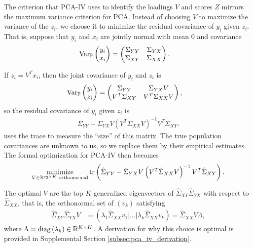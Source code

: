 \documentclass[utf8]{frontiersFPHY} %
\begin{document}
The criterion that PCA-IV uses to identify the loadings $V$ and scores $Z$
mirrors the maximum variance criterion for PCA. Instead of choosing $V$ to
maximize the variance of the $z_{i}$, we choose it to minimize the residual
covariance of $y_{i}$ given $z_{i}$. That is, suppose that $y_{i}$ and $x_{i}$
are jointly normal with mean 0 and covariance
\begin{align*}
\mathrm{Var}_{\mathbb{P}}\begin{pmatrix}y_{i} \\ x_{i}\end{pmatrix} &=
\begin{pmatrix}
  \Sigma_{YY} & \Sigma_{YX} \\ \Sigma_{XY} & \Sigma_{XX}
\end{pmatrix}.
\end{align*}

If $z_{i} = V^{T}x_{i}$, then the joint covariance of $y_{i}$ and $z_{i}$ is
\begin{align*}
  \mathrm{Var}_{\mathbb{P}}\begin{pmatrix} y_{i} \\ z_{i} \end{pmatrix} &=
  \begin{pmatrix}
    \Sigma_{YY} & \Sigma_{YX}V \\ V^{T}\Sigma_{XY} & V^{T}\Sigma_{XX}V
  \end{pmatrix},
\end{align*}
so the residual covariance of $y_i$ given $z_{i}$ is
\begin{align}
  \Sigma_{YY} -
  \Sigma_{YX}V\left(V^{T}\Sigma_{XX}V\right)^{-1}V^{T}\Sigma_{XY}. \label{eq:pca_iv_resid_cov}
\end{align}
\citep{rao1964use} uses the trace to measure the ``size'' of this matrix. The
true population covariances are unknown to us, so we replace them by their
empirical estimates. The formal optimization for PCA-IV then becomes
\begin{align}
  \mathop\mathrm{minimize}_{V\in \mathbb{R}^{p_{2} \times K} \text{ orthonormal}}
  \mathop\mathrm{tr}\left(\hat{\Sigma}_{YY} -
  \hat{\Sigma}_{YX}V\left(V^{T}\hat{\Sigma}_{XX}V\right)^{-1}V^{T}\hat{\Sigma}_{XY}\right) \label{eq:pca_iv_obj}.
\end{align}

The optimal $V$ are the top $K$ generalized eigenvectors of
$\hat{\Sigma}_{XY}\hat{\Sigma}_{YX}$ with respect to $\hat{\Sigma}_{XX}$, that
is, the orthonormal set of $\left(v_{k}\right)$ satisfying
\begin{align*}
\hat{\Sigma}_{XY}\hat{\Sigma}_{YX}V &= \left( \lambda_{1} \hat{\Sigma}_{XX}v_{1}
\vert \dots \vert \lambda_{k}\hat{\Sigma}_{XX}v_{k}\right) =
\hat{\Sigma}_{XX}V\Lambda,
\end{align*}
where $\Lambda = \mathop\mathrm{diag}\left(\lambda_{k}\right) \in \mathbb{R}^{K \times K}$. A
derivation for why this choice is optimal is provided in Supplemental Section
\ref{subsec:pca_iv_derivation}.
\end{document}
